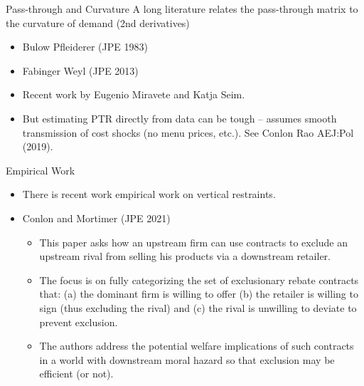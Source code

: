 \documentclass[aspectratio=169,11pt]{beamer}
\begin{document}



\begin{frame}{Pass-through and Curvature}
A long literature relates the pass-through matrix to the curvature of demand (2nd derivatives)
\begin{itemize}
\item Bulow Pfleiderer (JPE 1983)
\item Fabinger Weyl (JPE 2013)
\item Recent work by Eugenio Miravete and Katja Seim.
\item But estimating PTR directly from data can be tough -- assumes smooth transmission of cost shocks (no menu prices, etc.). See Conlon Rao AEJ:Pol (2019).
  \end{itemize}
\end{frame}




\begin{frame}{Empirical Work}
\begin{itemize}
\item There is recent work empirical work on \alert{vertical restraints}.
\item Conlon and Mortimer (JPE 2021)
\begin{itemize}
\item This paper asks how an \alert{upstream firm} can use contracts to \alert{exclude} an upstream rival from selling his products via a downstream retailer.
\item The focus is on fully categorizing the set of exclusionary rebate contracts that: (a) the dominant firm is willing to offer (b) the retailer is willing to sign (thus excluding the rival) and (c) the rival is unwilling to deviate to prevent exclusion.
\item The authors address the potential welfare implications of such contracts in a world with \alert{downstream moral hazard} so that exclusion may be efficient (or not).
\end{itemize}
\end{itemize}
\end{frame}
\end{document}
